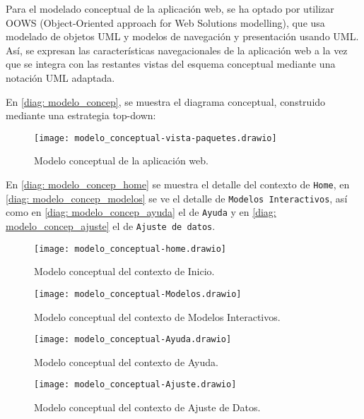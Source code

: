 Para el modelado conceptual de la aplicación web, se ha optado por utilizar OOWS (Object-Oriented approach for Web Solutions modelling), que usa modelado de objetos UML y modelos de navegación y presentación usando UML. Así, se expresan las características navegacionales de la aplicación web a la vez que se integra con las restantes vistas del esquema conceptual mediante una notación UML adaptada.

En \eqref{diag: modelo_concep}, se muestra el diagrama conceptual, construido mediante una estrategia top-down:

\begin{figure}[!h]
\begin{center}
\caption{Modelo conceptual de la aplicación web.}
\label{diag: modelo_concep}
\texttt{[image: modelo\_conceptual-vista-paquetes.drawio]}
\end{center}
\end{figure}

En \eqref{diag: modelo_concep_home} se muestra el detalle del contexto de \verb|Home|, en \eqref{diag: modelo_concep_modelos} se ve el detalle de \verb|Modelos Interactivos|, así como en \eqref{diag: modelo_concep_ayuda} el de \verb|Ayuda| y en \eqref{diag: modelo_concep_ajuste} el de \verb|Ajuste de datos|.

\begin{figure}[!h]
\begin{center}
\caption{Modelo conceptual del contexto de Inicio.}
\label{diag: modelo_concep_home}
\texttt{[image: modelo\_conceptual-home.drawio]}
\end{center}
\end{figure}

\begin{figure}[!h]
\begin{center}
\caption{Modelo conceptual del contexto de Modelos Interactivos.}
\label{diag: modelo_concep_modelos}
\texttt{[image: modelo\_conceptual-Modelos.drawio]}
\end{center}
\end{figure}

\begin{figure}[!h]
\begin{center}
\caption{Modelo conceptual del contexto de Ayuda.}
\label{diag: modelo_concep_ayuda}
\texttt{[image: modelo\_conceptual-Ayuda.drawio]}
\end{center}
\end{figure}

\begin{figure}[!h]
\begin{center}
\caption{Modelo conceptual del contexto de Ajuste de Datos.}
\label{diag: modelo_concep_ajuste}
\texttt{[image: modelo\_conceptual-Ajuste.drawio]}
\end{center}
\end{figure}







